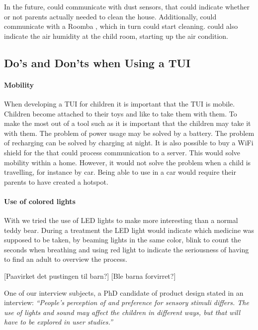In the future, \buddy{} could communicate with dust sensors, that could indicate whether or not parents actually needed to clean the house. Additionally, \buddy{} could communicate with a Roomba , which in turn could start cleaning. \buddy{} could also indicate the air humidity at the child room, starting up the air condition.   


\subsection{Do's and Don'ts when Using a TUI}
\label{sec:dosanddontsfortui}

\paragraph{Mobility}
When developing a TUI for children it is important that the TUI is mobile. Children become attached to their toys and like to take them with them. To make the most out of a tool such as \buddy{} it is important that the children may take it with them. The problem of power usage may be solved by a battery. The problem of recharging can be solved by charging at night. It is also possible to buy a WiFi shield for the \rpi{} that could process communication to a server. This would solve mobility within a home. However, it would not solve the problem when a child is travelling, for instance by car. Being able to use \ab{} in a car would require their parents to have created a hotspot.   

\paragraph{Use of colored lights}
With \buddy{} we tried the use of LED lights to make \buddy{} more interesting than a normal teddy bear. During a treatment the LED light would indicate which medicine was supposed to be taken, by beaming lights in the same color, blink to count the seconds when breathing and using red light to indicate the seriousness of having to find an adult to overview the process. 

[Paavirket det pustingen til barn?]
[Ble barna forvirret?]

One of our interview subjects, a PhD candidate of product design stated in an interview: 
\textit{``People's perception of and preference for sensory stimuli differs. The use of lights and sound may affect the children in different ways, but that will have to be explored in user studies.''} 

